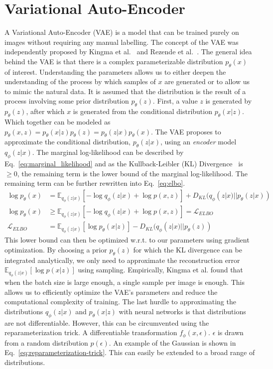 \section{Variational Auto-Encoder}
A Variational Auto-Encoder (VAE) is a model that can be trained purely on images without requiring any manual labelling. The concept of the VAE was independently proposed by Kingma et al.~\cite{kingma2014autoencodingvariationalbayes} and Rezende et al.~\cite{rezende2014stochastic}. The general idea behind the VAE is that there is a complex parameterizable distribution $p_\theta(x)$ of interest. Understanding the parameters allows us to either deepen the understanding of the process by which samples of $x$ are generated or to allow us to mimic the natural data. It is assumed that the distribution is the result of a process involving some prior distribution $p_\theta(z)$. First, a value $z$ is generated by $p_\theta(z)$, after which $x$ is generated from the conditional distribution $p_\theta(x | z)$. Which together can be modeled as $p_\theta(x, z) = p_\theta(x|z)p_\theta(z) = p_\theta(z|x)p_\theta(x)$. The VAE proposes to approximate the conditional distribution, $p_\theta(z|x)$, using an \emph{encoder} model $q_\phi(z|x)$. The marginal log-likelihood can be described by Eq.~\ref{eq:marginal_likelihood} and as the Kullback-Leibler (KL) Divergence~\cite{kullback1951information} is $\geq 0$, the remaining term is the lower bound of the marginal log-likelihood. The remaining term can be further rewritten into Eq.~\ref{eq:elbo}.
\begin{subequations}
    \begin{align}
        \log p_\theta(x)   & = \mathbb{E}_{q_{\phi}(z|x)}[-\log q_\phi(z|x) + \log p(x,z)] + D_{KL}(q_{\phi}(z|x) || p_\theta(z|x))\label{eq:marginal_likelihood} \\
        \log p_\theta(x)   & \geq \mathbb{E}_{q_{\phi}(z|x)}[-\log q_\phi(z|x) + \log p(x,z)] = \mathcal{L}_{ELBO}                                                \\
        \mathcal{L}_{ELBO} & = \mathbb{E}_{q_{\phi}(z|x)}[\log p_\theta(x|z)] - D_{KL}(q_{\phi}(z|x) || p_\theta(z))\label{eq:elbo}
    \end{align}
\end{subequations}
This lower bound can then be optimized w.r.t. to our parameters using gradient optimization. By choosing a prior $p_\theta(z)$ for which the KL divergence can be integrated analytically, we only need to approximate the reconstruction error $\mathbb{E}_{q_{\phi}(z|x)}[\log p(x|z)]$ using sampling. Empirically, Kingma et al. found that when the batch size is large enough, a single sample per image is enough. This allows us to efficiently optimize the VAE's parameters and reduce the computational complexity of training. The last hurdle to approximating the distributions $q_{\phi}(z | x)$ and $p_{\theta}(x | z)$ with neural networks is that distributions are not differentiable. However, this can be circumvented using the reparameterization trick. A differentiable transformation $f_\phi(x, \epsilon)$. $\epsilon$ is drawn from a random distribution $p(\epsilon)$. An example of the Gaussian is shown in Eq.~\ref{eq:reparameterization-trick}. This can easily be extended to a broad range of distributions.
